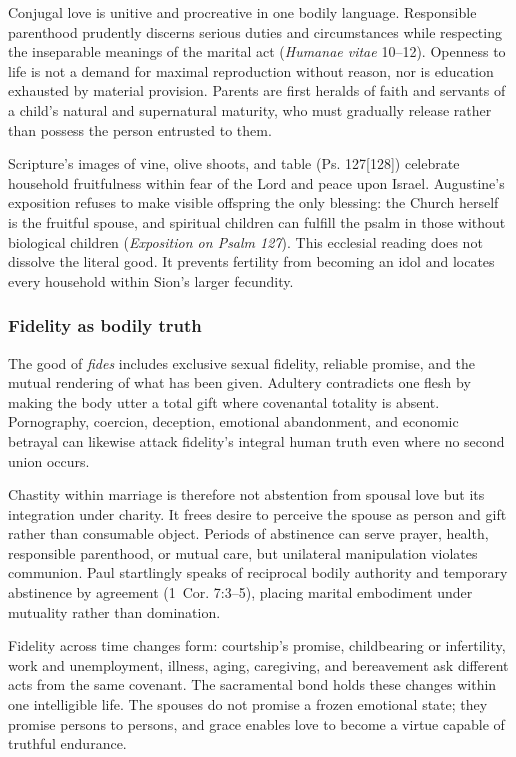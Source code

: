 Conjugal love is unitive and procreative in one bodily language. Responsible parenthood prudently discerns serious duties and circumstances while respecting the inseparable meanings of the marital act (\emph{Humanae vitae} 10--12). Openness to life is not a demand for maximal reproduction without reason, nor is education exhausted by material provision. Parents are first heralds of faith and servants of a child's natural and supernatural maturity, who must gradually release rather than possess the person entrusted to them.

Scripture's images of vine, olive shoots, and table (Ps. 127[128]) celebrate household fruitfulness within fear of the Lord and peace upon Israel. Augustine's exposition refuses to make visible offspring the only blessing: the Church herself is the fruitful spouse, and spiritual children can fulfill the psalm in those without biological children (\emph{Exposition on Psalm 127}). This ecclesial reading does not dissolve the literal good. It prevents fertility from becoming an idol and locates every household within Sion's larger fecundity.

\subsubsection{Fidelity as bodily truth}

The good of \emph{fides} includes exclusive sexual fidelity, reliable promise, and the mutual rendering of what has been given. Adultery contradicts one flesh by making the body utter a total gift where covenantal totality is absent. Pornography, coercion, deception, emotional abandonment, and economic betrayal can likewise attack fidelity's integral human truth even where no second union occurs.

Chastity within marriage is therefore not abstention from spousal love but its integration under charity. It frees desire to perceive the spouse as person and gift rather than consumable object. Periods of abstinence can serve prayer, health, responsible parenthood, or mutual care, but unilateral manipulation violates communion. Paul startlingly speaks of reciprocal bodily authority and temporary abstinence by agreement (1~Cor. 7:3--5), placing marital embodiment under mutuality rather than domination.

Fidelity across time changes form: courtship's promise, childbearing or infertility, work and unemployment, illness, aging, caregiving, and bereavement ask different acts from the same covenant. The sacramental bond holds these changes within one intelligible life. The spouses do not promise a frozen emotional state; they promise persons to persons, and grace enables love to become a virtue capable of truthful endurance.

